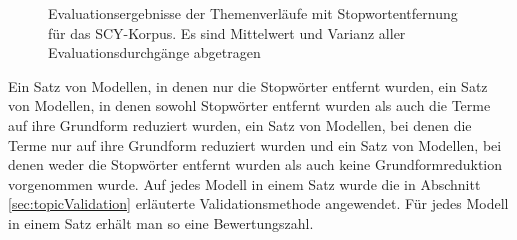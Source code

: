 \begin{figure}
\caption{Evaluationsergebnisse der Themenverläufe mit Stopwortentfernung für das SCY-Korpus. Es sind Mittelwert und Varianz aller Evaluationsdurchgänge abgetragen}
\label{fig:topicModelEvaluationStop}
\end{figure}

Ein Satz von Modellen, in denen nur die Stopwörter entfernt wurden, ein Satz von Modellen, in denen sowohl Stopwörter entfernt wurden als auch die Terme auf ihre Grundform reduziert wurden, ein Satz von Modellen, bei denen die Terme nur auf ihre Grundform reduziert wurden und ein Satz von Modellen, bei denen weder die Stopwörter entfernt wurden als auch keine Grundformreduktion vorgenommen wurde. Auf jedes Modell in einem Satz wurde die in Abschnitt \ref{sec:topicValidation} erläuterte Validationsmethode angewendet. Für jedes Modell in einem Satz erhält man so eine Bewertungszahl. 

